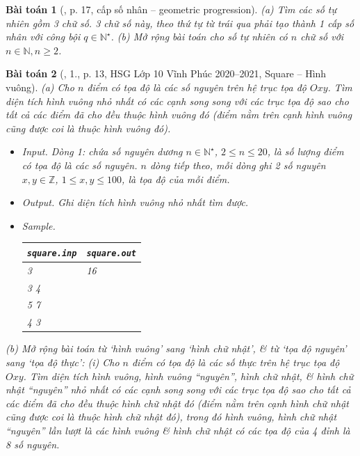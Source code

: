 \documentclass{article}
\newtheorem{baitoan}{Bài toán}
\begin{document}
\begin{baitoan}[\cite{Huy_sang_tao_thuat_toan_lap_trinh_tap_1}, p. 17, cấp số nhân -- geometric progression]
	(a) Tìm các số tự nhiên gồm 3 chữ số. 3 chữ số này, theo thứ tự từ trái qua phải tạo thành 1 cấp số nhân với công bội $q\in\mathbb{N}^\star$. (b) Mở rộng bài toán cho số tự nhiên có $n$ chữ số với $n\in\mathbb{N},n\ge2$.
\end{baitoan}

\begin{baitoan}[\cite{Trung_HSG_THPT_Tin}, 1., p. 13, HSG Lớp 10 Vĩnh Phúc 2020--2021, Square -- Hình vuông]
	(a) Cho $n$ điểm có tọa độ là các số nguyên trên hệ trục tọa độ $Oxy$. Tìm diện tích hình vuông nhỏ nhất có các cạnh song song với các trục tọa độ sao cho tất cả các điểm đã cho đều thuộc hình vuông đó (điểm nằm trên cạnh hình vuông cũng được coi là thuộc hình vuông đó).
	\begin{itemize}
		\item {\sf Input.} Dòng 1: chứa số nguyên dương $n\in\mathbb{N}^\star$, $2\le n\le20$, là số lượng điểm có tọa độ là các số nguyên. $n$ dòng tiếp theo, mỗi dòng ghi 2 số nguyên $x,y\in\mathbb{Z}$, $1\le x,y\le100$, là tọa độ của mỗi điểm.
		\item {\sf Output.} Ghi diện tích hình vuông nhỏ nhất tìm được.
		\item {\sf Sample.}
		\begin{table}[H]
			\centering
			\begin{tabular}{|l|l|}
				\hline
				{\tt square.inp} & {\tt square.out} \\
				\hline
				3 & 16 \\
				3 4 &  \\
				5 7 &  \\
				4 3 &  \\
				\hline
			\end{tabular}
		\end{table}
	\end{itemize}
	(b) Mở rộng bài toán từ `hình vuông' sang `hình chữ nhật', \& từ `tọa độ nguyên' sang `tọa độ thực': (i) Cho $n$ điểm có tọa độ là các số thực trên hệ trục tọa độ $Oxy$. Tìm diện tích hình vuông, hình vuông ``nguyên'', hình chữ nhật, \& hình chữ nhật ``nguyên'' nhỏ nhất có các cạnh song song với các trục tọa độ sao cho tất cả các điểm đã cho đều thuộc hình chữ nhật đó (điểm nằm trên cạnh hình chữ nhật cũng được coi là thuộc hình chữ nhật đó), trong đó {\rm hình vuông, hình chữ nhật ``nguyên''} lần lượt là các hình vuông \& hình chữ nhật có các tọa độ của 4 đỉnh là 8 số nguyên.
\end{baitoan}
\end{document}
